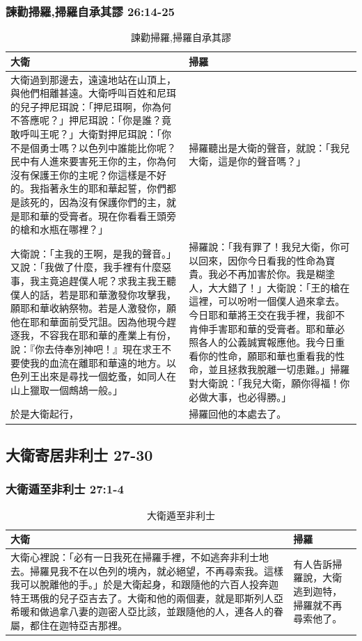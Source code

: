 \subsubsection{諫勸掃羅,掃羅自承其謬 26:14-25}
\begin{table}[H]
\hspace*{-5mm}
\centering
\begin{tabular}{p{9.75cm}|p{8.5cm}}\hline\hline
大衛&掃羅\\\hline
大衛過到那邊去，遠遠地站在山頂上，與他們相離甚遠。大衛呼叫百姓和尼珥的兒子押尼珥說：「押尼珥啊，你為何不答應呢？」押尼珥說：「你是誰？竟敢呼叫王呢？」大衛對押尼珥說：「你不是個勇士嗎？以色列中誰能比你呢？民中有人進來要害死王你的主，你為何沒有保護王你的主呢？你這樣是不好的。我指著永生的耶和華起誓，你們都是該死的，因為沒有保護你們的主，就是耶和華的受膏者。現在你看看王頭旁的槍和水瓶在哪裡？」&掃羅聽出是大衛的聲音，就說：「我兒大衛，這是你的聲音嗎？」\\\hline
大衛說：「主我的王啊，是我的聲音。」又說：「我做了什麼，我手裡有什麼惡事，我主竟追趕僕人呢？求我主我王聽僕人的話，若是耶和華激發你攻擊我，願耶和華收納祭物。若是人激發你，願他在耶和華面前受咒詛。因為他現今趕逐我，不容我在耶和華的產業上有份，說：『你去侍奉別神吧！』現在求王不要使我的血流在離耶和華遠的地方。以色列王出來是尋找一個虼蚤，如同人在山上獵取一個鷓鴣一般。」&掃羅說：「我有罪了！我兒大衛，你可以回來，因你今日看我的性命為寶貴。我必不再加害於你。我是糊塗人，大大錯了！」大衛說：「王的槍在這裡，可以吩咐一個僕人過來拿去。今日耶和華將王交在我手裡，我卻不肯伸手害耶和華的受膏者。耶和華必照各人的公義誠實報應他。我今日重看你的性命，願耶和華也重看我的性命，並且拯救我脫離一切患難。」掃羅對大衛說：「我兒大衛，願你得福！你必做大事，也必得勝。」\\\hline
於是大衛起行，&掃羅回他的本處去了。\\\hline
\end{tabular}
\caption{諫勸掃羅,掃羅自承其謬}
\end{table}

\subsection{大衛寄居非利士 27-30}
\subsubsection{大衛遁至非利士 27:1-4}
\begin{table}[H]
\hspace*{-5mm}
\centering
\begin{tabular}{p{14.25cm}|p{2.5cm}}\hline\hline
大衛&掃羅\\\hline
大衛心裡說：「必有一日我死在掃羅手裡，不如逃奔非利士地去。掃羅見我不在以色列的境內，就必絕望，不再尋索我。這樣我可以脫離他的手。」於是大衛起身，和跟隨他的六百人投奔迦特王瑪俄的兒子亞吉去了。大衛和他的兩個妻，就是耶斯列人亞希暖和做過拿八妻的迦密人亞比該，並跟隨他的人，連各人的眷屬，都住在迦特亞吉那裡。&有人告訴掃羅說，大衛逃到迦特，掃羅就不再尋索他了。 \\\hline
\end{tabular}
\caption{大衛遁至非利士}
\end{table}

